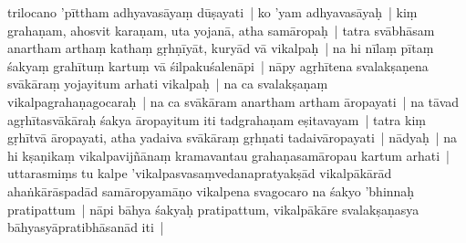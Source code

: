 \documentclass[article,a4paper]{memoir}
\newcommand{\persName}[1]{#1}
\begin{document}
	  \pstart \persName{trilocano} 'pī\-ttham adhyavasā\-yaṃ dū\-ṣayati | ko 'yam adhyavasā\-yaḥ | kiṃ grahaṇam, ahosvit karaṇam, uta yojanā\-, atha samā\-ropaḥ | tatra svā\-bhā\-sam anartham arthaṃ kathaṃ gṛhṇī\-yā\-t, kuryā\-d vā\- vikalpaḥ | na hi nī\-laṃ pī\-taṃ śakyaṃ grahī\-tuṃ kartuṃ vā\- śilpakuśalenā\-pi | nā\-py agṛhī\-tena svalakṣaṇena svā\-kā\-raṃ yojayitum arhati vikalpaḥ | na ca svalakṣaṇaṃ vikalpagrahaṇagocaraḥ | na ca svā\-kā\-ram anartham artham ā\-ropayati | na tā\-vad agṛhī\-tasvā\-kā\-raḥ śakya ā\-ropayitum iti tadgrahaṇam eṣitavayam | tatra kiṃ gṛhī\-tvā\- ā\-ropayati, atha yadaiva svā\-kā\-raṃ gṛhṇati tadaivā\-ropayati | nā\-dyaḥ | na hi kṣaṇikaṃ vikalpavijñā\-naṃ kramavantau grahaṇasamā\-ropau kartum arhati | uttarasmiṃs tu kalpe 'vikalpasvasaṃvedanapratyakṣā\-d vikalpā\-kā\-rā\-d ahaṅkā\-rā\-spadā\-d  samā\-ropyamā\-ṇo vikalpena svagocaro na śakyo 'bhinnaḥ pratipattum | nā\-pi bā\-hya śakyaḥ pratipattum, vikalpā\-kā\-re svalakṣaṇasya bā\-hyasyā\-pratibhā\-sanā\-d iti |
	\pend
      
\end{document}
